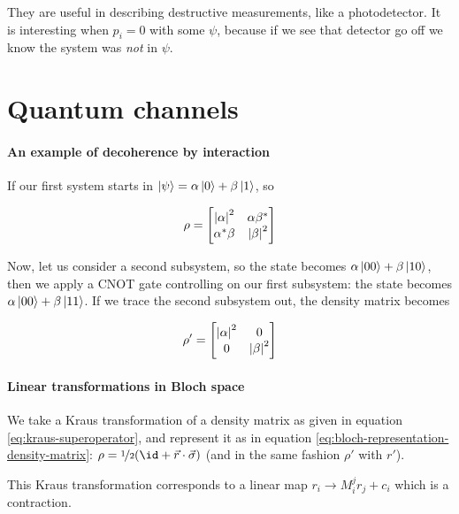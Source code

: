 \documentclass[main.tex]{subfiles}
\begin{document}
They are useful in describing destructive measurements, like a photodetector.
It is interesting when \(p_i = 0\) with some \(\psi\), because if we see that detector go off we know the system was \emph{not} in \(\psi\).

\section{Quantum channels}

\paragraph{An example of decoherence by interaction}

If our first system starts in \(\ket{\psi} = \alpha \ket{0} + \beta \ket{1} \), so

\begin{equation}
    \rho = \begin{bmatrix}
    \abs{\alpha}^2   & \alpha  \beta ^*  \\
     \alpha ^* \beta   & \abs{\beta}^2
 \end{bmatrix}
\end{equation}

Now, let us consider a second subsystem, so the state becomes \(\alpha \ket{00} + \beta \ket{10}\), then we apply a CNOT gate controlling on our first subsystem: the state becomes \(\alpha \ket{00} + \beta \ket{11}\). If we trace the second subsystem out, the density matrix becomes

\begin{equation}
    \rho' = \begin{bmatrix}
    \abs{\alpha}^2   & 0  \\
     0   & \abs{\beta}^2
 \end{bmatrix}
\end{equation}

\paragraph{Linear transformations in Bloch space}

We take a Kraus transformation of a density matrix as given in equation \eqref{eq:kraus-superoperator}, and represent it as in equation \eqref{eq:bloch-representation-density-matrix}:  \(\rho = \frac[i]{1}{2} \qty(\id + \vec{r} \cdot \vec{\sigma} )\) (and in the same fashion \(\rho'\) with \(r'\)).

\begin{claim}
This Kraus transformation corresponds to a linear map \(r_i \rightarrow M_i^j r_j + c_i\) which is a contraction.
\end{claim}
\end{document}
